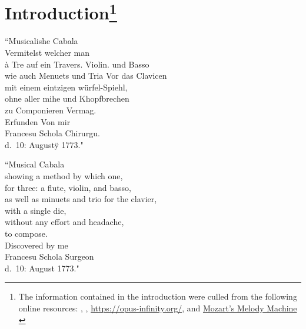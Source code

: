 \documentclass[a4paper,x11names,svgnames,10pt]{article}
\begin{document}
{\section[Introduction]{Introduction\footnote{The information contained in the introduction were culled from the following online resources:
		\citet{schola1773},
		\citet{wiki_mw2017},
		\url{https://opus-infinity.org/}, and 
		\href{https://www.sciencenews.org/article/mozarts-melody-machine-0}{Mozart's Melody Machine} \citep*{peterson2001}
	}
}
\begin{center}
	\begin{minipage}{0.4\textwidth}
		\begin{flushleft}
			\begin{center}
				``\small Musicalishe Cabala \\ Vermitelst welcher man \\ à Tre auf ein Travers. Violin. und Basso \\ wie auch Menuets und Tria Vor das Clavicen \\ mit einem eintzigen würfel-Spiehl, \\ ohne aller mihe und Khopfbrechen \\ zu Componieren Vermag. \\ Erfunden Von mir \\ Francesu Schola Chirurgu. \\ d.\ 10: Augustÿ 1773."
			\end{center}
		\end{flushleft}
	\end{minipage}
	\begin{minipage}{0.4\textwidth}
		\begin{flushright}
			\begin{center}
				``\small Musical Cabala \\ showing a method by which one, \\ for three: a flute, violin, and basso, \\ as well as minuets and trio for the clavier, \\ with a single die, \\ without any effort and headache, \\ to compose. \\
				Discovered by me \\ Francesu Schola Surgeon \\ d.\ 10: August 1773."
			\end{center}
		\end{flushright}
	\end{minipage}
\end{center}

}
\end{document}
